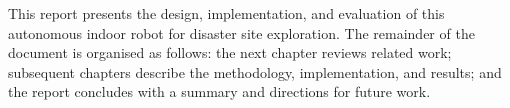 This report presents the design, implementation, and evaluation of this autonomous indoor robot for disaster site exploration. The remainder of the document is organised as follows: the next chapter reviews related work; subsequent chapters describe the methodology, implementation, and results; and the report concludes with a summary and directions for future work.
